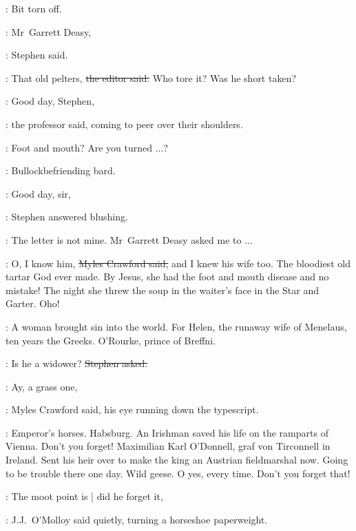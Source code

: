 \StephenInt:
Bit torn off.

\Stephen:
Mr~Garrett Deasy,

:
Stephen said.

\crawford:
That old pelters,
\sout{the editor said.}
Who tore it?
Was he short taken?



\machugh:
Good day, Stephen,

:
the professor said,
coming to peer over their shoulders.

\machugh:
Foot and mouth?
Are you turned ...?

\StephenInt:
Bullockbefriending bard.



\Stephen:
Good day, sir,

:
Stephen answered blushing.

\Stephen:
The letter is not mine.
Mr~Garrett Deasy asked me to ...

\crawford:
O, I know him,
\sout{Myles Crawford said,}
and I knew his wife too.
The bloodiest old tartar God ever made.
By Jesus,
she had the foot and mouth disease
and no mistake!
The night she threw the soup in the waiter's face in the Star and Garter.
Oho!

\StephenInt:
A woman brought sin into the world.
For Helen,
the runaway wife of Menelaus,
ten years the Greeks.
O'Rourke,
prince of Breffni.

\Stephen:
Is he a widower?
\sout{Stephen asked.}

\crawford:
Ay, a grass one,

:
Myles Crawford said,
his eye running down the typescript.

\crawford:
Emperor's horses.
Habsburg.
An Irishman saved his life on the ramparts of Vienna.
Don't you forget!
Maximilian Karl O'Donnell,
graf von Tirconnell in Ireland.
Sent his heir over to make the king an Austrian fieldmarshal now.
Going to be trouble there one day.
Wild geese.
O yes, every time.
Don't you forget that!

\jjom:
The moot point is |
did he forget it,

:
J.J.~O'Molloy said quietly,
turning a horseshoe paperweight.

